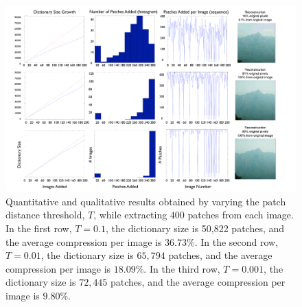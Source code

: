  \begin{figure}
\includegraphics[width=1\linewidth]{Figures/perfGraphs_25_big.pdf}
\caption{Quantitative and qualitative results obtained by varying the patch distance threshold, $T$, while extracting $400$ patches from each image. In the first row, $T=0.1$, the dictionary size is 50,822 patches, and the average compression per image is $36.73\%$. In the second row, $T=0.01$, the dictionary size is $65,794$ patches, and the average compression per image is $18.09\%$. In the third row, $T=0.001$, the dictionary size is $72,445$ patches, and the average compression per image is $9.80\%$.}
\label{fig:perfGraphs}
\end{figure}

